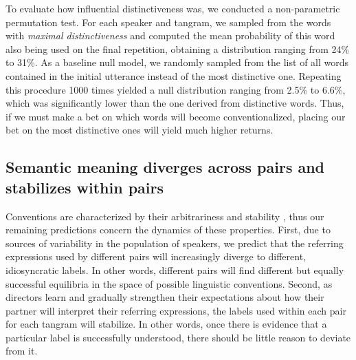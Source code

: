 \documentclass[alpha-refs]{wiley-article}
\begin{document}
To evaluate how influential distinctiveness was, we conducted a non-parametric permutation test.
For each speaker and tangram, we sampled from the words with \emph{maximal distinctiveness} and computed the mean probability of this word also being used on the final repetition, obtaining a distribution ranging from 24\% to 31\%.
As a baseline null model, we randomly sampled from the list of all words contained in the initial utterance instead of the most distinctive one.
Repeating this procedure 1000 times yielded a null distribution ranging from 2.5\% to 6.6\%, which was significantly lower than the one derived from distinctive words.
Thus, if we must make a bet on which words will become conventionalized, placing our bet on the most distinctive ones will yield much higher returns.

\subsection{Semantic meaning diverges across pairs and stabilizes within pairs}

Conventions are characterized by their arbitrariness and stability \citep{Lewis69_Convention}, thus our remaining predictions concern the dynamics of these properties.
First, due to sources of variability in the population of speakers, we predict that the referring expressions used by different pairs will increasingly diverge to different, idiosyncratic labels.
In other words, different pairs will find different but equally successful equilibria in the space of possible linguistic conventions.
Second, as directors learn and gradually strengthen their expectations about how their partner will interpret their referring expressions, the labels used within each pair for each tangram will stabilize.
In other words, once there is evidence that a particular label is successfully understood, there should be little reason to deviate from it.
\end{document}
